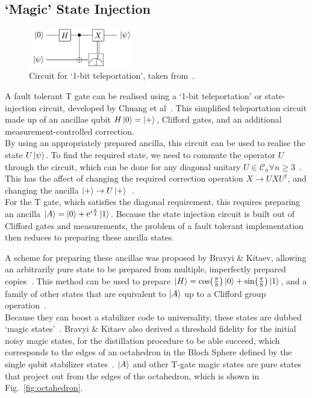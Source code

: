 \documentclass{standalone}
\begin{document}
\subsection{`Magic' State Injection}\label{sec:msi}
\begin{figure}
    \centering
    \includegraphics[width=0.4\textwidth]{Figures/1-bit-Teleport.png}
\caption{Circuit for `1-bit teleportation', taken from~\cite{Zhou2000}.}
\label{fig:MSI}
\end{figure}
A fault tolerant T gate can be realised using a `1-bit teleportation' or state-injection circuit, developed by Chuang et al~\cite{Zhou2000}. This simplified teleportation circuit made up of an ancillae qubit $H\ket{0}=\ket{+}$, Clifford gates, and an additional measurement-controlled correction.\\
By using an appropriately prepared ancilla, this circuit can be used to realise the state $U\ket{\psi}$. To find the required state, we need to commute the operator $U$ through the circuit, which can be done for any diagonal unitary $U\in\mathcal{C}_{n}\forall n\geq 3$~\cite{Zhou2000}. This has the affect of changing the required correction operation $X\rightarrow UXU^{\dagger}$, and changing the ancilla $\ket{+}\rightarrow U\ket{+}$~\cite{Zhou2000}.\\
For the T gate, which satisfies the diagonal requirement, this requires preparing an ancilla $\ket{A}=\ket{0}+\mathrm{e}^{i\frac{\pi}{4}}\ket{1}$. Because the state injection circuit is built out of Clifford gates and measurements, the problem of a fault tolerant implementation then reduces to preparing these ancilla states.
\par
A scheme for preparing these ancillae was proposed by Bravyi \& Kitaev, allowing an arbitrarily pure state to be prepared from multiple, imperfectly prepared copies~\cite{Bravyi2005}. This method can be used to prepare $\ket{H}=\cos(\frac{\pi}{8})\ket{0}+\sin(\frac{\pi}{8})\ket{1}$, and a family of other states that are equivalent to $\ket{A}$ up to a Clifford group operation~\cite{Bravyi2005}.\\
Because they can boost a stabilizer code to universality, these states are dubbed `magic states'~\cite{Bravyi2005}. Bravyi \& Kitaev also derived a threshold fidelity for the initial noisy magic states, for the distillation procedure to be able succeed, which corresponds to the edges of an octahedron in the Bloch Sphere defined by the single qubit stabilizer states~\cite{Bravyi2005}. $\ket{A}$ and other T-gate magic states are pure states that project out from the edges of the octahedron, which is shown in Fig.~\ref{fig:octahedron}.\\
\end{document}
